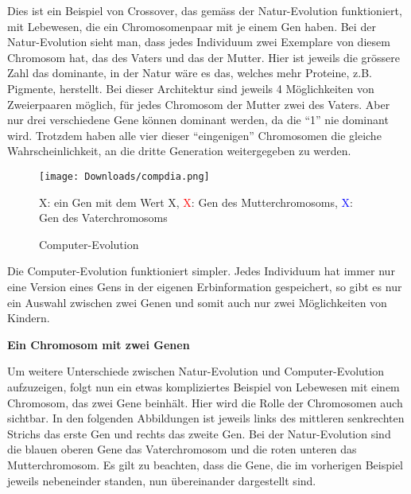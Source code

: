 \documentclass[10pt,a4paper,ngerman,english]{article}
\begin{document}
Dies ist ein Beispiel von Crossover, das gemäss der Natur-Evolution funktioniert, mit Lebewesen, die ein Chromosomenpaar mit je einem Gen haben. Bei der Natur-Evolution sieht man, dass jedes Individuum zwei Exemplare von diesem Chromosom hat, das des Vaters und das der Mutter. Hier ist jeweils die grössere Zahl das dominante, in der Natur wäre es das, welches mehr Proteine, z.B. Pigmente, herstellt. Bei dieser Architektur sind jeweils 4 Möglichkeiten von Zweierpaaren möglich, für jedes Chromosom der Mutter zwei des Vaters. Aber nur drei verschiedene Gene können dominant werden, da die \enquote{1} nie dominant wird. Trotzdem haben alle vier dieser \enquote{eingenigen} Chromosomen die gleiche Wahrscheinlichkeit, an die dritte Generation weitergegeben zu werden.

\begin{wrapfigure}[6]{r}{0.5\textwidth} 
    \vspace{-20pt}
        \begin{center}
            \texttt{[image: Downloads/compdia.png]}
            \vspace{-20pt}
            \caption{Computer-Evolution}
            \medskip
            \scriptsize
            X: ein Gen mit dem Wert X, \textcolor{red}{X}: Gen des Mutterchromosoms, \textcolor{blue}{X}: Gen des Vaterchromosoms
        \end{center}
    \vspace{-30pt}
\end{wrapfigure}

\bigskip
Die Computer-Evolution funktioniert simpler. Jedes Individuum hat immer nur eine Version eines Gens in der eigenen Erbinformation gespeichert, so gibt es nur ein Auswahl zwischen zwei Genen und somit auch nur zwei Möglichkeiten von Kindern.

\vspace{10 em}

\textbf{Ein Chromosom mit zwei Genen}

\bigskip
Um weitere Unterschiede zwischen Natur-Evolution und Computer-Evolution aufzuzeigen, folgt nun ein etwas kompliziertes Beispiel von Lebewesen mit einem Chromosom, das zwei Gene beinhält. Hier wird die Rolle der Chromosomen auch sichtbar. In den folgenden Abbildungen ist jeweils links des mittleren senkrechten Strichs das erste Gen und rechts das zweite Gen. Bei der Natur-Evolution sind die blauen oberen Gene das Vaterchromosom und die roten unteren das Mutterchromosom. Es gilt zu beachten, dass die Gene, die im vorherigen Beispiel jeweils nebeneinder standen, nun übereinander dargestellt sind.
\end{document}
